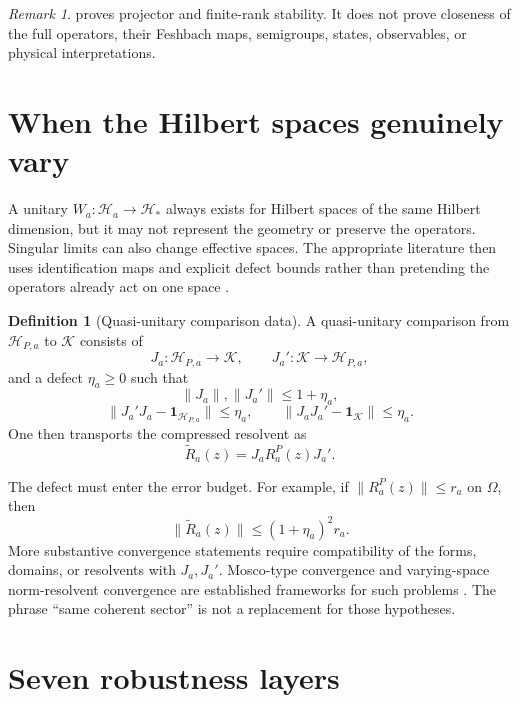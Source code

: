 \documentclass[11pt]{article}
\theoremstyle{definition}
\newtheorem{definition}[theorem]{Definition}
\theoremstyle{remark}
\newtheorem{remark}[theorem]{Remark}
\newcommand{\cH}{\mathcal H}
\newcommand{\cK}{\mathcal K}
\newcommand{\1}{\mathbf 1}
\begin{document}
\begin{remark}
 proves projector and finite-rank stability.  It does not
prove closeness of the full operators, their Feshbach maps, semigroups,
states, observables, or physical interpretations.
\end{remark}

\section{When the Hilbert spaces genuinely vary}
\label{sec:varying}

A unitary \(W_a:\cH_a\to\cH_*\) always exists for Hilbert spaces of the same
Hilbert dimension, but it may not represent the geometry or preserve the
operators.  Singular limits can also change effective spaces.  The
appropriate literature then uses identification maps and explicit defect
bounds rather than pretending the operators already act on one space
\cite{KuwaeShioya2003,Post2012}.

\begin{definition}[Quasi-unitary comparison data]
A quasi-unitary comparison from \(\cH_{P,a}\) to \(\cK\) consists of
\[
 J_a:\cH_{P,a}\to\cK,
 \qquad
 J_a':\cK\to\cH_{P,a},
\]
and a defect \(\eta_a\geq0\) such that
\[
 \|J_a\|,\|J_a'\|\leq1+\eta_a,
\]
\[
 \|J_a'J_a-\1_{\cH_{P,a}}\|\leq\eta_a,
 \qquad
 \|J_aJ_a'-\1_{\cK}\|\leq\eta_a.
\]
One then transports the compressed resolvent as
\[
 \widetilde R_a(z)=J_aR_a^P(z)J_a'.
\]
\end{definition}

The defect must enter the error budget.  For example, if
\(\|R_a^P(z)\|\leq r_a\) on \(\Omega\), then
\[
 \|\widetilde R_a(z)\|
 \leq
 (1+\eta_a)^2r_a.
\]
More substantive convergence statements require compatibility of the
forms, domains, or resolvents with \(J_a,J_a'\).  Mosco-type convergence
and varying-space norm-resolvent convergence are established frameworks
for such problems \cite{KuwaeShioya2003,Post2012}.  The phrase ``same
coherent sector'' is not a replacement for those hypotheses.

\section{Seven robustness layers}
\label{sec:layers}
\end{document}
